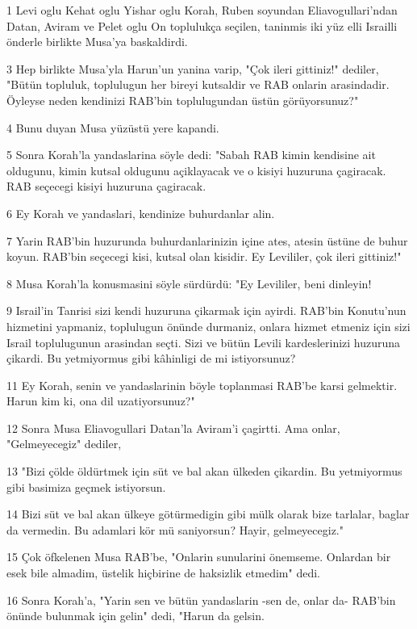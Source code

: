 \par 1 Levi oglu Kehat oglu Yishar oglu Korah, Ruben soyundan Eliavogullari'ndan Datan, Aviram ve Pelet oglu On toplulukça seçilen, taninmis iki yüz elli Israilli önderle birlikte Musa'ya baskaldirdi.
\par 3 Hep birlikte Musa'yla Harun'un yanina varip, "Çok ileri gittiniz!" dediler, "Bütün topluluk, toplulugun her bireyi kutsaldir ve RAB onlarin arasindadir. Öyleyse neden kendinizi RAB'bin toplulugundan üstün görüyorsunuz?"
\par 4 Bunu duyan Musa yüzüstü yere kapandi.
\par 5 Sonra Korah'la yandaslarina söyle dedi: "Sabah RAB kimin kendisine ait oldugunu, kimin kutsal oldugunu açiklayacak ve o kisiyi huzuruna çagiracak. RAB seçecegi kisiyi huzuruna çagiracak.
\par 6 Ey Korah ve yandaslari, kendinize buhurdanlar alin.
\par 7 Yarin RAB'bin huzurunda buhurdanlarinizin içine ates, atesin üstüne de buhur koyun. RAB'bin seçecegi kisi, kutsal olan kisidir. Ey Levililer, çok ileri gittiniz!"
\par 8 Musa Korah'la konusmasini söyle sürdürdü: "Ey Levililer, beni dinleyin!
\par 9 Israil'in Tanrisi sizi kendi huzuruna çikarmak için ayirdi. RAB'bin Konutu'nun hizmetini yapmaniz, toplulugun önünde durmaniz, onlara hizmet etmeniz için sizi Israil toplulugunun arasindan seçti. Sizi ve bütün Levili kardeslerinizi huzuruna çikardi. Bu yetmiyormus gibi kâhinligi de mi istiyorsunuz?
\par 11 Ey Korah, senin ve yandaslarinin böyle toplanmasi RAB'be karsi gelmektir. Harun kim ki, ona dil uzatiyorsunuz?"
\par 12 Sonra Musa Eliavogullari Datan'la Aviram'i çagirtti. Ama onlar, "Gelmeyecegiz" dediler,
\par 13 "Bizi çölde öldürtmek için süt ve bal akan ülkeden çikardin. Bu yetmiyormus gibi basimiza geçmek istiyorsun.
\par 14 Bizi süt ve bal akan ülkeye götürmedigin gibi mülk olarak bize tarlalar, baglar da vermedin. Bu adamlari kör mü saniyorsun? Hayir, gelmeyecegiz."
\par 15 Çok öfkelenen Musa RAB'be, "Onlarin sunularini önemseme. Onlardan bir esek bile almadim, üstelik hiçbirine de haksizlik etmedim" dedi.
\par 16 Sonra Korah'a, "Yarin sen ve bütün yandaslarin -sen de, onlar da- RAB'bin önünde bulunmak için gelin" dedi, "Harun da gelsin.
